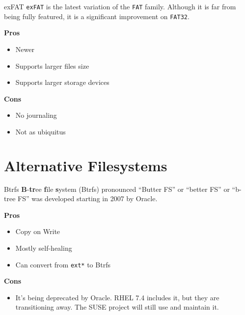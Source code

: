\documentclass{lug}
\begin{document}
\begin{frame}{exFAT}
    \texttt{exFAT} is the latest variation of the \texttt{FAT} family. Although
    it is far from being fully featured, it is a significant improvement on
    \texttt{FAT32}.

    \textbf{Pros}
    \begin{itemize}
        \item Newer
        \item Supports larger files size
        \item Supports larger storage devices
    \end{itemize}

    \textbf{Cons}
    \begin{itemize}
        \item No journaling
        \item Not as ubiquitus
    \end{itemize}
\end{frame}

\section{Alternative Filesystems}
\begin{frame}{Btrfs}
    \textbf{B}-\textbf{tr}ee \textbf{f}ile \textbf{s}ystem (Btrfs) pronounced
    ``Butter FS'' or ``better FS'' or ``b-tree FS'' was developed starting in
    2007 by Oracle.

    \textbf{Pros}
    \begin{itemize}
        \item Copy on Write
        \item Mostly self-healing
        \item Can convert from \texttt{ext*} to Btrfs
    \end{itemize}

    \textbf{Cons}
    \begin{itemize}
        \item It's being deprecated by Oracle. RHEL 7.4 includes it, but they
            are transitioning away. The SUSE project will still use and maintain
            it.
    \end{itemize}
\end{frame}


\end{document}
